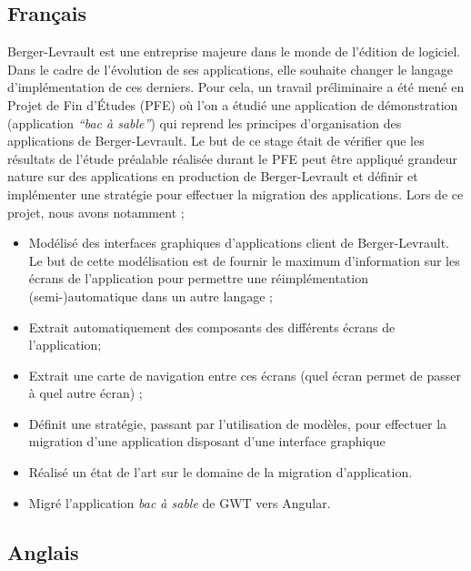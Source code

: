 \hypertarget{franuxe7ais}{%
\subsection{Français}\label{franuxe7ais}}

Berger-Levrault est une entreprise majeure dans le monde de l'édition de
logiciel. Dans le cadre de l'évolution de ses applications, elle
souhaite changer le langage d'implémentation de ces derniers. Pour cela,
un travail préliminaire a été mené en Projet de Fin d'Études (PFE) où
l'on a étudié une application de démonstration (application \emph{``bac
à sable''}) qui reprend les principes d'organisation des applications de
Berger-Levrault. Le but de ce stage était de vérifier que les résultats
de l'étude préalable réalisée durant le PFE peut être appliqué grandeur
nature sur des applications en production de Berger-Levrault et définir
et implémenter une stratégie pour effectuer la migration des
applications. Lors de ce projet, nous avons notamment ;

\begin{itemize}
\tightlist
\item
  Modélisé des interfaces graphiques d'applications client de
  Berger-Levrault. Le but de cette modélisation est de fournir le
  maximum d'information sur les écrans de l'application pour permettre
  une réimplémentation (semi-)automatique dans un autre langage ;
\item
  Extrait automatiquement des composants des différents écrans de
  l'application;
\item
  Extrait une carte de navigation entre ces écrans (quel écran permet de
  passer à quel autre écran) ;
\item
  Définit une stratégie, passant par l'utilisation de modèles, pour
  effectuer la migration d'une application disposant d'une interface
  graphique
\item
  Réalisé un état de l'art sur le domaine de la migration d'application.
\item
  Migré l'application \emph{bac à sable} de GWT vers Angular.
\end{itemize}

\hypertarget{anglais}{%
\subsection{Anglais}\label{anglais}}
